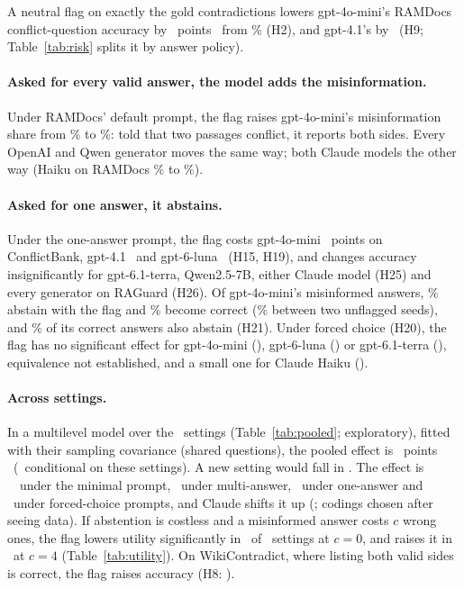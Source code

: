 A neutral flag on exactly the gold contradictions lowers gpt-4o-mini's RAMDocs conflict-question accuracy
by \adOracleFlagConf\ points \dOracleFlagConfCI\ from \plainConf\% (H2), and gpt-4.1's by \agptOracleFlagConf\ (H9; Table~\ref{tab:risk} splits it by answer policy).

\paragraph{Asked for every valid answer, the model adds the misinformation.} Under RAMDocs' default prompt,
the flag raises gpt-4o-mini's
misinformation share from \zmRdMiniPlainWrong\% to \zmRdMiniOracleFlagWrong\%: told that two
passages conflict, it reports both sides. Every OpenAI and Qwen generator moves the same way; both Claude models
the other way (Haiku on RAMDocs \zmRdHaikuPlainWrong\% to \zmRdHaikuOracleFlagWrong\%).

\paragraph{Asked for one answer, it abstains.} Under the one-answer prompt, the
flag costs gpt-4o-mini \azSgMiniOracleFlagConflict\ points on ConflictBank, gpt-4.1 \azSgFourOracleFlagConflict\ and
gpt-6-luna \azSgLunaOracleFlagConflict\ (H15, H19), and changes accuracy insignificantly for gpt-6.1-terra,
Qwen2.5-7B, either Claude model (H25) and every generator on RAGuard (H26). Of gpt-4o-mini's misinformed answers, \trSgMiniNeutralMisinfoAbstain\% abstain with the flag and
\trSgMiniNeutralMisinfoCorrect\% become correct (\trNullSgMiniMisinfoCorrect\% between two unflagged seeds), and \trSgMiniNeutralCorrectAbstain\% of its
correct answers also abstain (H21). Under forced choice (H20), the flag has no
significant effect for gpt-4o-mini (\hTwentyFcMiniFlag), gpt-6-luna (\hTwentyFcLunaFlag) or gpt-6.1-terra
(\hTwentyFcTerraFlag), equivalence not established, and a small one for Claude Haiku (\hTwentyFcHaikuFlag).

\paragraph{Across settings.} In a multilevel model over the \neuMlK\ settings (Table~\ref{tab:pooled}; exploratory),
fitted with their sampling covariance (shared questions), the pooled effect is \neuMlMu\ points
\neuMlCI\ (\neuMlCIDesign\ conditional on these settings). A new setting would fall in \neuMlPI. The effect is
\neuPolMinimal\ \neuPolMinimalCI\ under the minimal prompt, \neuPolMulti\ under
multi-answer, \neuPolSingle\ under one-answer and \neuPolForced\ under forced-choice prompts, and Claude
shifts it up (\neuMlAnthropic; codings chosen after seeing data). If abstention is costless and a misinformed answer
costs $c$ wrong ones, the flag lowers utility significantly in \nUtilSixNegZero\ of \nUtilSixSettings\ settings at
$c=0$, and raises it in \nUtilSixPosFour\ at $c=4$ (Table~\ref{tab:utility}). On WikiContradict, where listing both valid sides is
correct, the flag raises accuracy (H8: \wikiOracleFlag).

